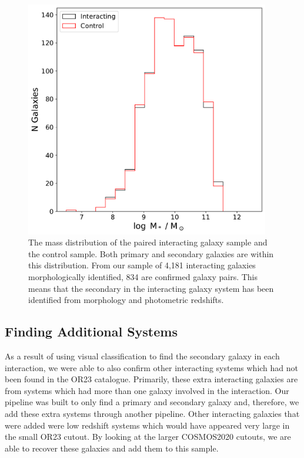 \begin{figure}
    \centering
    \includegraphics[width=0.95\textwidth]{Chapter3/figures/mass-matching-pairs.pdf}
    \caption{The mass distribution of the paired interacting galaxy sample and the control sample. Both primary and secondary galaxies are within this distribution. From our sample of 4,181 interacting galaxies morphologically identified, 834 are confirmed galaxy pairs. This means that the secondary in the interacting galaxy system has been identified from morphology and photometric redshifts.}
    \label{fig:matched-distributions}
\end{figure}

\subsection{Finding Additional Systems}
\noindent As a result of using visual classification to find the secondary galaxy in each interaction, we were able to also confirm other interacting systems which had not been found in the OR23 catalogue. Primarily, these extra interacting galaxies are from systems which had more than one galaxy involved in the interaction. Our pipeline was built to only find a primary and secondary galaxy and, therefore, we add these extra systems through another pipeline. Other interacting galaxies that were added were low redshift systems which would have appeared very large in the small OR23 cutout. By looking at the larger COSMOS2020 cutouts, we are able to recover these galaxies and add them to this sample.

